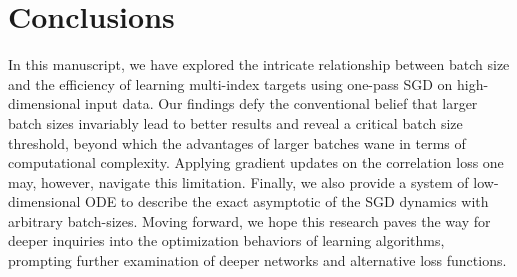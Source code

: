 \section{Conclusions}
\label{2406:sec:main:conclusion}
In this manuscript, we have explored the intricate relationship between batch size and the efficiency of learning multi-index targets using one-pass SGD on high-dimensional input data. Our findings defy the conventional belief that larger batch sizes invariably lead to better results  and reveal a critical batch size threshold, beyond which the advantages of larger batches wane in terms of computational complexity. Applying gradient updates on the correlation loss one may, however, navigate this limitation. Finally, we also provide a system of low-dimensional ODE to describe the exact asymptotic of the SGD dynamics with arbitrary batch-sizes. Moving forward, we hope this research paves the way for deeper inquiries into the optimization behaviors of learning algorithms, prompting further examination of deeper networks and alternative loss functions.

 


